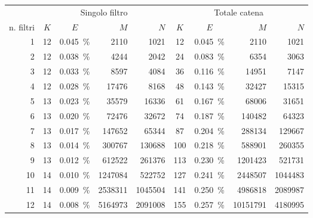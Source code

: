 \begin{tabular}{ r | c c r r | c c r r }
    \hline
    \rowcolor{blue!20}           & \multicolumn{4}{c}{Singolo filtro} & \multicolumn{4}{c}{Totale catena} \\
    \rowcolor{blue!20} n. filtri & $K$ & $E$ & $M$ & $N$              & $K$ & $E$ & $M$ & $N$ \\
    \hline
    \rowcolor[gray]{0.925}
    \num{1} & \num{12} & \SI{0.045}{\%} & \num{2110} & \num{1021} & \num{12} & \SI{0.045}{\%} & \num{2110} & \num{1021} \\
    \num{2} & \num{12} & \SI{0.038}{\%} & \num{4244} & \num{2042} & \num{24} & \SI{0.083}{\%} & \num{6354} & \num{3063} \\
    \rowcolor[gray]{0.925}
    \num{3} & \num{12} & \SI{0.033}{\%} & \num{8597} & \num{4084} & \num{36} & \SI{0.116}{\%} & \num{14951} & \num{7147} \\
    \num{4} & \num{12} & \SI{0.028}{\%} & \num{17476} & \num{8168} & \num{48} & \SI{0.143}{\%} & \num{32427} & \num{15315} \\
    \rowcolor[gray]{0.925}
    \num{5} & \num{13} & \SI{0.023}{\%} & \num{35579} & \num{16336} & \num{61} & \SI{0.167}{\%} & \num{68006} & \num{31651} \\
    \num{6} & \num{13} & \SI{0.020}{\%} & \num{72476} & \num{32672} & \num{74} & \SI{0.187}{\%} & \num{140482} & \num{64323} \\
    \rowcolor[gray]{0.925}
    \num{7} & \num{13} & \SI{0.017}{\%} & \num{147652} & \num{65344} & \num{87} & \SI{0.204}{\%} & \num{288134} & \num{129667} \\
    \num{8} & \num{13} & \SI{0.014}{\%} & \num{300767} & \num{130688} & \num{100} & \SI{0.218}{\%} & \num{588901} & \num{260355} \\
    \rowcolor[gray]{0.925}
    \num{9} & \num{13} & \SI{0.012}{\%} & \num{612522} & \num{261376} & \num{113} & \SI{0.230}{\%} & \num{1201423} & \num{521731} \\
    \num{10} & \num{14} & \SI{0.010}{\%} & \num{1247084} & \num{522752} & \num{127} & \SI{0.241}{\%} & \num{2448507} & \num{1044483} \\
    \rowcolor[gray]{0.925}
    \num{11} & \num{14} & \SI{0.009}{\%} & \num{2538311} & \num{1045504} & \num{141} & \SI{0.250}{\%} & \num{4986818} & \num{2089987} \\
    \num{12} & \num{14} & \SI{0.008}{\%} & \num{5164973} & \num{2091008} & \num{155} & \SI{0.257}{\%} & \num{10151791} & \num{4180995} \\

\end{tabular}
